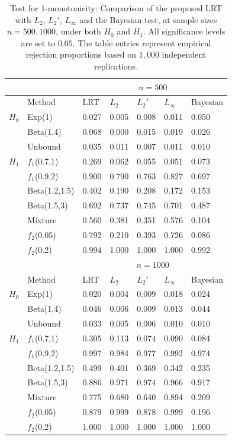 \documentclass[12pt,letterpaper, twoside, openany]{article}
\theoremstyle{plain}
\begin{document}
\begin{table}
\centering
\begin{tabular}{lllllll}
\hline
    \multicolumn{1}{c}{} && \multicolumn{5}{c}{$n=500$} \\ \hline
 &Method & LRT & $L_2$ & $L_2'$ & $L_\infty$ &  Bayesian\\ 
 \hline
$H_0$ &Exp(1) & 0.027 & 0.005 & 0.008 & 0.011 &  0.050 \\ 
 & Beta(1,4) & 0.068 & 0.000 & 0.015 & 0.019 &  0.026\\ 
  &Unbound & 0.035 & 0.011 & 0.007 & 0.011 & 0.010 \\  \hline
  $H_1$ & $f_1$(0.7,1) & 0.269 & 0.062 & 0.055 & 0.051   & 0.073\\ 
  &$f_1$(0.9,2) & 0.900 & 0.790 & 0.763 & 0.827 &  0.697\\ 
  &Beta(1.2,1.5) & 0.402 & 0.190 & 0.208 & 0.172  & 0.153 \\ 
  &Beta(1.5,3) & 0.692 & 0.737 & 0.745 & 0.701 &  0.487 \\ 
  &Mixture & 0.560 & 0.381 & 0.351 & 0.576 &  0.104\\ 
  &$f_2$(0.05) & 0.792 & 0.210 & 0.393 & 0.726 &  0.086\\ 
  &$f_2$(0.2) & 0.994 & 1.000 & 1.000 & 1.000 &  0.992\\ 
   \hline
     \multicolumn{1}{c}{} && \multicolumn{5}{c}{$n=1000$} \\ \hline
 &Method & LRT & $L_2$ & $L_2'$ & $L_\infty$ & Bayesian\\ 
 \hline
$H_0$ &Exp(1) &  0.020 & 0.004 & 0.009 & 0.018 & 0.024\\ 
 & Beta(1,4) &0.046 & 0.006 & 0.009 & 0.013 &0.044\\ 
  &Unbound &0.033 & 0.005 & 0.006 & 0.010 & 0.010\\  \hline
  $H_1$ & $f_1$(0.7,1) &  0.305 & 0.113 & 0.074 & 0.090  & 0.084\\ 
  &$f_1$(0.9,2) & 0.997 & 0.984 & 0.977 & 0.992 & 0.974\\ 
  &Beta(1.2,1.5) & 0.499 & 0.401 & 0.369 & 0.342  & 0.235\\ 
  &Beta(1.5,3) &  0.886 & 0.971 & 0.974 & 0.966&  0.917\\ 
  &Mixture & 0.775 & 0.680 & 0.640 & 0.894 & 0.209\\ 
  &$f_2$(0.05) &  0.879 & 0.999 & 0.878 & 0.999 & 0.196\\ 
  &$f_2$(0.2) &  1.000 & 1.000 & 1.000 & 1.000   &1.000\\ 
   \hline
\end{tabular}
\caption{Test for 1-monotonicity: Comparison of the proposed LRT with $L_2$, $L_2'$, $L_\infty$ and the Bayesian test, at sample sizes $n = 500, 1000$, under both $H_0$ and $H_1$. All significance levels are set to $0.05$. The table entries represent empirical rejection proportions based on $1{,}000$ independent replications.}
    \label{table:monotone_result2}
\end{table}
\end{document}
